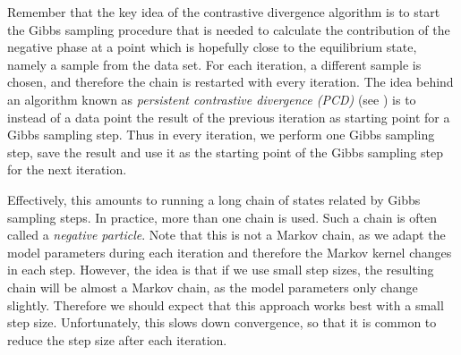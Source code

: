 \documentclass[a4paper, draft]{article}
\theoremstyle{own}
\theoremstyle{remark}
\begin{document}
Remember that the key idea of the contrastive divergence algorithm is to start the Gibbs sampling procedure that is needed to calculate the contribution of the negative phase at a point which is hopefully close to the equilibrium state, namely a sample from the data set. For each iteration, a different sample is chosen, and therefore the chain is restarted with every iteration. The idea behind an algorithm known as {\em persistent contrastive divergence (PCD)} (see \cite{Tieleman2008}) is to instead of a data point the result of the previous iteration as starting point for a Gibbs sampling step. Thus in every iteration, we perform one Gibbs sampling step, save the result and use it as the starting point of the Gibbs sampling step for the next iteration.

Effectively, this amounts to running a long chain of states related by Gibbs sampling steps. In practice, more than one chain is used. Such a chain is often called a {\em negative particle}. Note that this is not a Markov chain, as we adapt the model parameters during each iteration and therefore the Markov kernel changes in each step. However, the idea is that if we use small step sizes, the resulting chain will be almost a Markov chain, as the model parameters only change slightly. Therefore we should expect that this approach works best with a small step size. Unfortunately, this slows down convergence, so that it is common to reduce the step size after each iteration.
\end{document}
